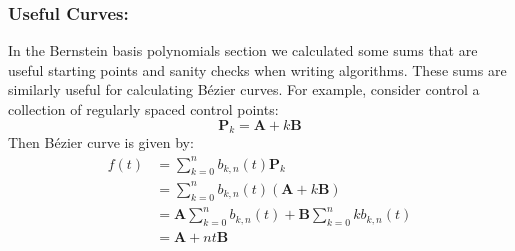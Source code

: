 \subsubsection{Useful Curves:}
In the Bernstein basis polynomials section we calculated some sums that are useful starting points and sanity checks when writing algorithms.
These sums are similarly useful for calculating Bézier curves.
For example,
consider control a collection of regularly spaced control points:
\[\mathbf{P}_k = \mathbf{A}+k\mathbf{B}\]
Then Bézier curve is given by:
\[\begin{aligned}
	f(t) &= \sum_{k=0}^nb_{k,n}(t)\mathbf{P}_k\\
	&= \sum_{k=0}^nb_{k,n}(t)(\mathbf{A}+k\mathbf{B})\\
	&= \mathbf{A}\sum_{k=0}^nb_{k,n}(t)+\mathbf{B}\sum_{k=0}^nkb_{k,n}(t)\\
	&= \mathbf{A}+nt\mathbf{B}\\
\end{aligned}\]
